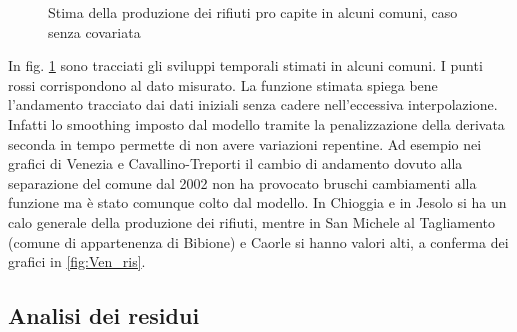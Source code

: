 \documentclass[a4paper,11pt,twoside,openright]{book}							%
\begin{document}
\begin{figure}[t]
{   }
	\caption{Stima della produzione dei rifiuti pro capite in alcuni comuni, caso senza covariata}
	\label{fig:Ven_tempo}
\end{figure}

In fig. \ref{fig:Ven_tempo} sono tracciati gli sviluppi temporali stimati in alcuni comuni. I punti rossi corrispondono al dato misurato. La funzione stimata spiega bene l'andamento tracciato dai dati iniziali senza cadere nell'eccessiva interpolazione. Infatti lo smoothing imposto dal modello tramite la penalizzazione della derivata seconda in tempo permette di non avere variazioni repentine. Ad esempio nei grafici di Venezia e Cavallino-Treporti il cambio di andamento dovuto alla separazione del comune dal 2002 non ha provocato bruschi cambiamenti alla funzione ma è stato comunque colto dal modello. In Chioggia e in Jesolo si ha un calo generale della produzione dei rifiuti, mentre in San Michele al Tagliamento (comune di appartenenza di Bibione) e Caorle si hanno valori alti, a conferma dei grafici in \ref{fig:Ven_ris}.

\subsection{Analisi dei residui}
\end{document}
